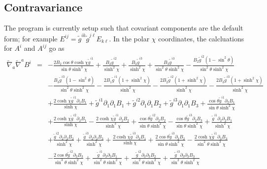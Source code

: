 \documentclass[10pt,letterpaper]{article}
\numberwithin{equation}{section}
\begin{document}
%
%
%
\newpage
\begin{appendices}
\section{Contravariance}
The program is currently setup such that covariant components are the default form; for example $E^{ij} = \tilde g^{ik} \tilde g^{j\ell}E_{k\ell}$. In the polar $\chi$ coordinates, the calcluations for $A^i$ and $A^{ij}$ go as
\begin{eqnarray}
\tilde\nabla_a\tilde\nabla^a B^{i}&=& - \frac{2 B_{2} \cos\theta \cosh\chi \tilde{g}^{i1}}{\sin\theta \sinh^3\chi} + \frac{B_{2} \tilde{g}^{i2}}{\sinh^2\chi} + \frac{B_{3} \tilde{g}^{i3}}{\sinh^2\chi} + \frac{B_{3} \tilde{g}^{i3}}{\sin^2\theta \sinh^2\chi} -  \frac{B_{2} \tilde{g}^{i2} (1 -  \sin^2\theta)}{\sin^2\theta \sinh^2\chi} \nonumber \\ 
&& -  \frac{B_{3} \tilde{g}^{i3} (1 -  \sin^2\theta)}{\sin^2\theta \sinh^2\chi} -  \frac{2 B_{1} \tilde{g}^{i1} (1 + \sinh^2\chi)}{\sinh^2\chi} -  \frac{2 B_{2} \tilde{g}^{i2} (1 + \sinh^2\chi)}{\sinh^2\chi} -  \frac{2 B_{3} \tilde{g}^{i3} (1 + \sinh^2\chi)}{\sinh^2\chi} \nonumber \\ 
&& + \frac{2 \cosh\chi \tilde{g}^{i1} \partial_{1}B_{1}}{\sinh\chi} + \tilde{g}^{i1} \partial_{1}\partial_{1}B_{1} + \tilde{g}^{i2} \partial_{1}\partial_{1}B_{2} + \tilde{g}^{i3} \partial_{1}\partial_{1}B_{3} + \frac{\cos\theta \tilde{g}^{i1} \partial_{2}B_{1}}{\sin\theta \sinh^2\chi} \nonumber \\ 
&& + \frac{2 \cosh\chi \tilde{g}^{i2} \partial_{2}B_{1}}{\sinh\chi} -  \frac{2 \cosh\chi \tilde{g}^{i1} \partial_{2}B_{2}}{\sinh^3\chi} + \frac{\cos\theta \tilde{g}^{i2} \partial_{2}B_{2}}{\sin\theta \sinh^2\chi} -  \frac{\cos\theta \tilde{g}^{i3} \partial_{2}B_{3}}{\sin\theta \sinh^2\chi} + \frac{\tilde{g}^{i1} \partial_{2}\partial_{2}B_{1}}{\sinh^2\chi} \nonumber \\ 
&& + \frac{\tilde{g}^{i2} \partial_{2}\partial_{2}B_{2}}{\sinh^2\chi} + \frac{\tilde{g}^{i3} \partial_{2}\partial_{2}B_{3}}{\sinh^2\chi} + \frac{2 \cosh\chi \tilde{g}^{i3} \partial_{3}B_{1}}{\sinh\chi} + \frac{2 \cos\theta \tilde{g}^{i3} \partial_{3}B_{2}}{\sin\theta \sinh^2\chi} -  \frac{2 \cosh\chi \tilde{g}^{i1} \partial_{3}B_{3}}{\sin^2\theta \sinh^3\chi} \nonumber \\ 
&& -  \frac{2 \cos\theta \tilde{g}^{i2} \partial_{3}B_{3}}{\sin^3\theta \sinh^2\chi} + \frac{\tilde{g}^{i1} \partial_{3}\partial_{3}B_{1}}{\sin^2\theta \sinh^2\chi} + \frac{\tilde{g}^{i2} \partial_{3}\partial_{3}B_{2}}{\sin^2\theta \sinh^2\chi} + \frac{\tilde{g}^{i3} \partial_{3}\partial_{3}B_{3}}{\sin^2\theta \sinh^2\chi}

\end{eqnarray}
\end{appendices}
\end{document}
